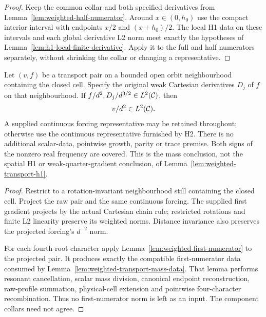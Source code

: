 \begin{proof}
\leanok
Keep the common collar and both specified derivatives from
Lemma~\ref{lem:weighted-half-numerator}.
Around $x\in(0,h_0)$ use the compact interior interval with endpoints
$x/2$ and $(x+h_0)/2$. The local H1 data on these intervals and each
global derivative L2 norm meet exactly the hypotheses of
Lemma~\ref{lem:h1-local-finite-derivative}.
Apply it to the full and half numerators separately, without shrinking
the collar or changing a representative.
\end{proof}

\begin{lemma}
\label{lem:weighted-transport-second-mass}
\leanok
Let $(v,f)$ be a transport pair on a bounded open orbit neighbourhood
containing the closed cell. Specify the original weak Cartesian
derivatives $D_j$ of $f$ on that neighbourhood.
If $f/d^2,D_j/d^{3/2}\in L^2(\mathcal{C})$, then
\[
 v/d^2\in L^2(\mathcal{C}).
\]
A supplied continuous forcing representative may be retained throughout;
otherwise use the continuous representative furnished by H2.
There is no additional scalar-data, pointwise growth, parity or trace premise.
Both signs of the nonzero real frequency are covered.
This is the mass conclusion, not the spatial H1 or weak-quarter-gradient
conclusion, of Lemma~\ref{lem:weighted-transport-h1}.
\end{lemma}

\begin{proof}
\leanok
Restrict to a rotation-invariant neighbourhood still containing the closed
cell. Project the raw pair and the same continuous forcing.
The supplied first gradient projects by the actual Cartesian chain rule;
restricted rotations and finite L2 linearity preserve its weighted norms.
Distance invariance also preserves the projected forcing's $d^{-2}$ norm.

For each fourth-root character apply
Lemma~\ref{lem:weighted-first-numerator} to the projected pair.
It produces exactly the compatible first-numerator data consumed by
Lemma~\ref{lem:weighted-transport-mass-data}.
That lemma performs resonant cancellation, scalar mass division, canonical
endpoint reconstruction, raw-profile summation, physical-cell extension
and pointwise four-character recombination.
Thus no first-numerator norm is left as an input.
The component collars need not agree.
\end{proof}

